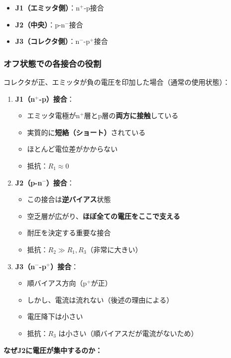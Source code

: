 \begin{itemize}
\item \textbf{J1（エミッタ側）}：n$^+$-p接合
\item \textbf{J2（中央）}：p-n$^-$接合
\item \textbf{J3（コレクタ側）}：n$^-$-p$^+$接合
\end{itemize}

\subsubsection{オフ状態での各接合の役割}

コレクタが正、エミッタが負の電圧を印加した場合（通常の使用状態）：

\begin{enumerate}
\item \textbf{J1（n$^+$-p）接合}：
\begin{itemize}
\item エミッタ電極がn$^+$層とp層の\textbf{両方に接触}している
\item 実質的に\textbf{短絡（ショート）}されている
\item ほとんど電位差がかからない
\item 抵抗：$R_1 \approx 0$
\end{itemize}

\item \textbf{J2（p-n$^-$）接合}：
\begin{itemize}
\item この接合は\textbf{逆バイアス}状態
\item 空乏層が広がり、\textbf{ほぼ全ての電圧をここで支える}
\item 耐圧を決定する重要な接合
\item 抵抗：$R_2 \gg R_1, R_3$（非常に大きい）
\end{itemize}

\item \textbf{J3（n$^-$-p$^+$）接合}：
\begin{itemize}
\item 順バイアス方向（p$^+$が正）
\item しかし、電流は流れない（後述の理由による）
\item 電圧降下は小さい
\item 抵抗：$R_3$ は小さい（順バイアスだが電流がないため）
\end{itemize}
\end{enumerate}

\textbf{なぜJ2に電圧が集中するのか：}

